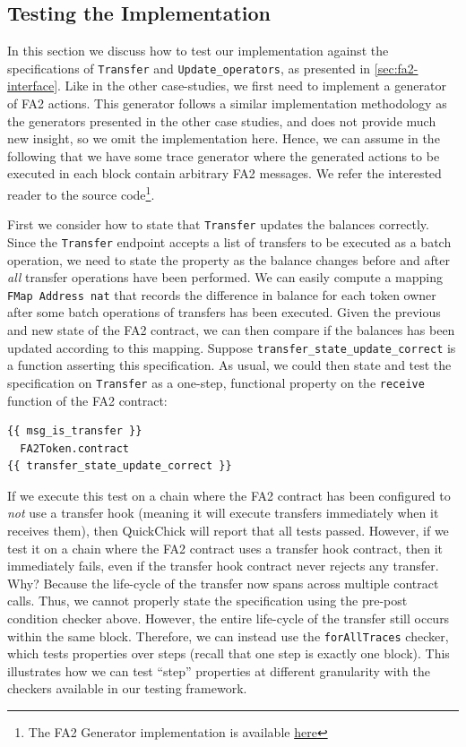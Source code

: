 \documentclass[twoside,11pt,openright]{report}
\newenvironment{code}{\captionsetup{type=figure, singlelinecheck=off, justification=raggedleft}}{}
\newcommand{\coq}[1]{\texttt{#1}}
\begin{document}
\subsection{Testing the Implementation}
In this section we discuss how to test our implementation against the specifications of \coq{Transfer} and \coq{Update\_operators}, as presented in \autoref{sec:fa2-interface}. Like in the other case-studies, we first need to implement a generator of FA2 actions. This generator follows a similar implementation methodology as the generators presented in the other case studies, and does not provide much new insight, so we omit the implementation here. Hence, we can assume in the following that we have some trace generator where the generated actions to be executed in each block contain arbitrary FA2 messages. We refer the interested reader to the source code\footnote{The FA2 Generator implementation is available \href{https://github.com/mikkelmilo/ConCert/blob/master/execution/tests/FA2Tests/FA2Gens.v}{here}}.


First we consider how to state that \coq{Transfer} updates the balances correctly. Since the \coq{Transfer} endpoint accepts a list of transfers to be executed as a batch operation, we need to state the property as the balance changes before and after \textit{all} transfer operations have been performed. We can easily compute a mapping \coq{FMap Address nat} that records the difference in balance for each token owner after some batch operations of transfers has been executed. Given the previous and new state of the FA2 contract, we can then compare if the balances has been updated according to this mapping. Suppose \coq{transfer\_state\_update\_correct} is a function asserting this specification. As usual, we could then state and test the specification on \coq{Transfer} as a one-step, functional property on the \coq{receive} function of the FA2 contract:
\begin{code}
\begin{verbatim}
{{ msg_is_transfer }} 
  FA2Token.contract 
{{ transfer_state_update_correct }}
\end{verbatim}
\end{code}
If we execute this test on a chain where the FA2 contract has been configured to \textit{not} use a transfer hook (meaning it will execute transfers immediately when it receives them), then QuickChick will report that all tests passed. However, if we test it on a chain where the FA2 contract uses a transfer hook contract, then it immediately fails, even if the transfer hook contract never rejects any transfer. Why? Because the life-cycle of the transfer now spans across multiple contract calls. Thus, we cannot properly state the specification using the pre-post condition checker above. However, the entire life-cycle of the transfer still occurs within the same block. Therefore, we can instead use the \coq{forAllTraces} checker, which tests properties over steps (recall that one step is exactly one block). This illustrates how we can test ``step'' properties at different granularity with the checkers available in our testing framework. 
\end{document}
